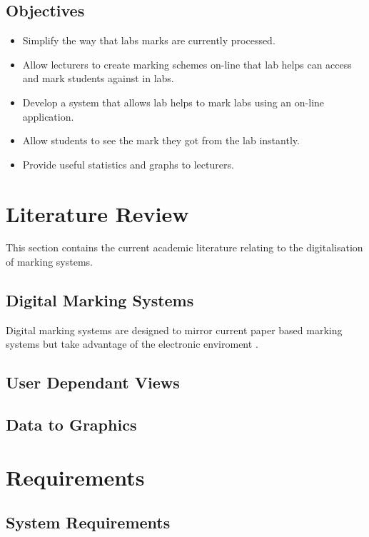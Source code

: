 \documentclass[12pt]{article}  %
\theoremstyle{definition}
\theoremstyle{remark}
\begin{document}
\subsection{Objectives}
\begin{itemize}
\item Simplify the way that labs marks are currently processed.
\item Allow lecturers to create marking schemes on-line that lab helps can access and mark students against in labs.
\item Develop a system that allows lab helps to mark labs using an on-line application.
\item Allow students to see the mark they got from the lab instantly.
\item Provide useful statistics and graphs to lecturers.
\end{itemize}






\newpage
\section{Literature Review}

This section contains the current academic literature relating to the digitalisation of marking systems. 
\subsection{Digital Marking Systems}
Digital marking systems are designed to mirror current paper based marking systems but take advantage of the electronic enviroment \cite{joy_effective_1998}. 

\subsection{User Dependant Views}


\subsection{Data to Graphics}





\newpage
\section{Requirements}
\subsection{System Requirements}
\end{document}
